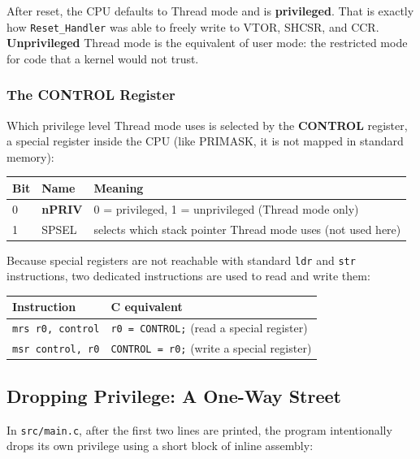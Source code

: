 After reset, the CPU defaults to Thread mode and is \textbf{privileged}. That is exactly how \texttt{Reset\_Handler} was able to freely write to VTOR, SHCSR, and CCR. \textbf{Unprivileged} Thread mode is the equivalent of user mode: the restricted mode for code that a kernel would not trust.

\subsubsection{The CONTROL Register}
Which privilege level Thread mode uses is selected by the \textbf{CONTROL} register, a special register inside the CPU (like PRIMASK, it is not mapped in standard memory):

\begin{table}[h!]
    \centering
    \begin{tabular}{|l|l|l|}
        \hline
        \textbf{Bit} & \textbf{Name} & \textbf{Meaning} \\ \hline
        0 & \textbf{nPRIV} & 0 = privileged, 1 = unprivileged (Thread mode only) \\ \hline
        1 & SPSEL & selects which stack pointer Thread mode uses (not used here) \\ \hline
    \end{tabular}
\end{table}

Because special registers are not reachable with standard \texttt{ldr} and \texttt{str} instructions, two dedicated instructions are used to read and write them:

\begin{table}[h!]
    \centering
    \begin{tabular}{|l|l|}
        \hline
        \textbf{Instruction} & \textbf{C equivalent} \\ \hline
        \texttt{mrs r0, control} & \texttt{r0 = CONTROL;} (read a special register) \\ \hline
        \texttt{msr control, r0} & \texttt{CONTROL = r0;} (write a special register) \\ \hline
    \end{tabular}
\end{table}

\subsection{Dropping Privilege: A One-Way Street}
In \texttt{src/main.c}, after the first two lines are printed, the program intentionally drops its own privilege using a short block of inline assembly:

